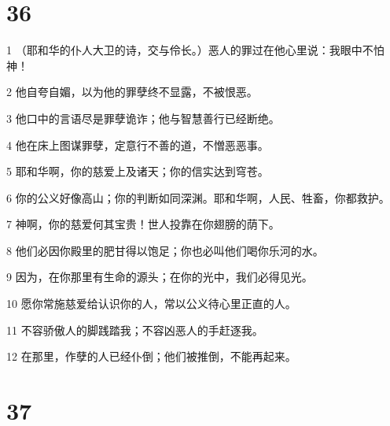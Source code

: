 \chapter{36}

\par 1 （耶和华的仆人大卫的诗，交与伶长。）恶人的罪过在他心里说：我眼中不怕神！
\par 2 他自夸自媚，以为他的罪孽终不显露，不被恨恶。
\par 3 他口中的言语尽是罪孽诡诈；他与智慧善行已经断绝。
\par 4 他在床上图谋罪孽，定意行不善的道，不憎恶恶事。
\par 5 耶和华啊，你的慈爱上及诸天；你的信实达到穹苍。
\par 6 你的公义好像高山；你的判断如同深渊。耶和华啊，人民、牲畜，你都救护。
\par 7 神啊，你的慈爱何其宝贵！世人投靠在你翅膀的荫下。
\par 8 他们必因你殿里的肥甘得以饱足；你也必叫他们喝你乐河的水。
\par 9 因为，在你那里有生命的源头；在你的光中，我们必得见光。
\par 10 愿你常施慈爱给认识你的人，常以公义待心里正直的人。
\par 11 不容骄傲人的脚践踏我；不容凶恶人的手赶逐我。
\par 12 在那里，作孽的人已经仆倒；他们被推倒，不能再起来。

\chapter{37}

